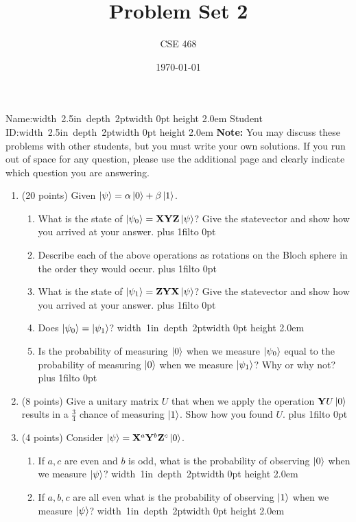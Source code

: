 \documentclass[12pt]{article}
\title{Problem Set 2}
\author{CSE 468}
\date{\today}
\newcommand{\Blank}{\mbox{\hskip 4pt\vrule width 1in depth 2pt}\vrule width 0pt height 2.0em}
\newcommand{\NameBlank}{\mbox{\hskip 4pt\vrule width 2.5in depth 2pt}\vrule width 0pt height 2.0em}
\def\DefaultSpace{1in}
\newcommand{\LeaveSpace}[1][\DefaultSpace]{%
\vskip #1 plus 1fil\relax\hbox to 0pt{\hss} %
}
\begin{document}
\maketitle

\noindent Name:\NameBlank{} \newline
\noindent Student ID:\NameBlank{} \newline
\textbf{Note:} You may discuss these problems with other students, but you must write your own solutions. If you run out of space for any question, please use the additional page and clearly indicate which question you are answering.
\begin{enumerate}[font=\bfseries]
    \item (20 points) Given $\ket{\psi} = \alpha\ket{0} + \beta\ket{1}$.
    \begin{enumerate}
        \item What is the state of $\ket{\psi_0} = \mathbf{X}\mathbf{Y}\mathbf{Z}\ket{\psi}$? Give the statevector and show how you arrived at your answer. \LeaveSpace[0.4in]
        \item Describe each of the above operations as rotations on the Bloch sphere in the order they would occur.\LeaveSpace{}
        \item What is the state of $\ket{\psi_1} = \mathbf{Z}\mathbf{Y}\mathbf{X}\ket{\psi}$? Give the statevector and show how you arrived at your answer. \LeaveSpace[0.4in]
        \item Does $\ket{\psi_0} = \ket{\psi_1}$? \Blank{}
        \item Is the probability of measuring $\ket{0}$ when we measure $\ket{\psi_0}$ equal to the probability of measuring $\ket{0}$ when we measure $\ket{\psi_1}$? Why or why not?\LeaveSpace{}
    \end{enumerate}
    \item (8 points) Give a unitary matrix $U$ that when we apply the operation $\mathbf{Y}U\ket{0}$ results in a $\frac{3}{4}$ chance of measuring $\ket{1}$. Show how you found $U$. \LeaveSpace[2.0in]
    \item (4 points) Consider $\ket{\psi} = \mathbf{X}^a\mathbf{Y}^b\mathbf{Z}^c\ket{0}$.
    \begin{enumerate}
        \item If $a,c$ are even and $b$ is odd, what is the probability of observing $\ket{0}$ when we measure $\ket{\psi}$? \Blank{}
        \item If $a,b,c$ are all even what is the probability of observing $\ket{1}$ when we measure $\ket{\psi}$? \Blank{}

\end{enumerate}
\end{enumerate}
\end{document}
